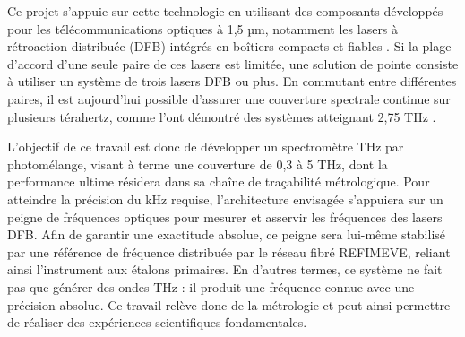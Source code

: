 Ce projet s'appuie sur cette technologie en utilisant des composants développés pour les télécommunications optiques à 1,5 µm, notamment les lasers à rétroaction distribuée (DFB) intégrés en boîtiers compacts et fiables \cite{Stanze2010}. Si la plage d'accord d'une seule paire de ces lasers est limitée, une solution de pointe consiste à utiliser un système de trois lasers DFB ou plus. En commutant entre différentes paires, il est aujourd'hui possible d'assurer une couverture spectrale continue sur plusieurs térahertz, comme l'ont démontré des systèmes atteignant 2,75 THz \cite{Deninger2015}.

L'objectif de ce travail est donc de développer un spectromètre THz par photomélange, visant à terme une couverture de 0,3 à 5 THz, dont la performance ultime résidera dans sa chaîne de traçabilité métrologique. Pour atteindre la précision du kHz requise, l'architecture envisagée s'appuiera sur un peigne de fréquences optiques pour mesurer et asservir les fréquences des lasers DFB. Afin de garantir une exactitude absolue, ce peigne sera lui-même stabilisé par une référence de fréquence distribuée par le réseau fibré REFIMEVE, reliant ainsi l'instrument aux étalons primaires. En d'autres termes, ce système ne fait pas que générer des ondes THz : il produit une fréquence connue avec une précision absolue. Ce travail relève donc de la métrologie et peut ainsi permettre de réaliser des expériences scientifiques fondamentales. 






